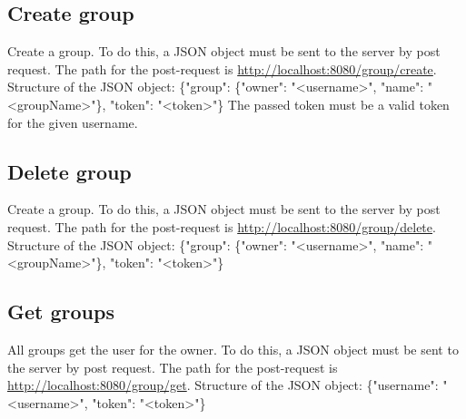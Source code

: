 \documentclass[12pt]{scrartcl}
\begin{document}
    \subsection{Create group}
        Create a group.
        To do this, a JSON object must be sent to the server by post request. The path for the post-request is
        \url {http://localhost:8080/group/create}.
        Structure of the JSON object: \{"group": \{"owner": "<username>", "name": "<groupName>"\}, "token": "<token>"\}
        The passed token must be a valid token for the given username.

    \subsection{Delete group}
        Create a group.
        To do this, a JSON object must be sent to the server by post request. The path for the post-request is
        \url {http://localhost:8080/group/delete}.
        Structure of the JSON object: \{"group": \{"owner": "<username>", "name": "<groupName>"\}, "token": "<token>"\}

    \subsection{Get groups}
        All groups get the user for the owner.
        To do this, a JSON object must be sent to the server by post request. The path for the post-request is
        \url {http://localhost:8080/group/get}.
        Structure of the JSON object: \{"username": "<username>", "token": "<token>"\}
\end{document}
